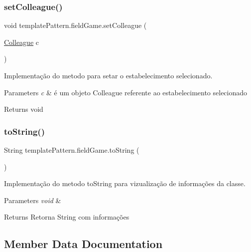 \subsubsection{\texorpdfstring{setColleague()}{setColleague()}}
{\footnotesize\ttfamily void template\+Pattern.\+field\+Game.\+set\+Colleague (\begin{DoxyParamCaption}\item[{\mbox{\hyperlink{classmediator_pattern_1_1_colleague}{Colleague}}}]{c }\end{DoxyParamCaption})}



Implementação do metodo para setar o estabelecimento selecionado. 


\begin{DoxyParams}{Parameters}
{\em c} & é um objeto Colleague referente ao estabelecimento selecionado \\
\hline
\end{DoxyParams}
\begin{DoxyReturn}{Returns}
void 
\end{DoxyReturn}
\mbox{\label{classtemplate_pattern_1_1field_game_a7dd7b0d767ea43e7f41f9acf9515e0cc}} 
\subsubsection{\texorpdfstring{toString()}{toString()}}
{\footnotesize\ttfamily String template\+Pattern.\+field\+Game.\+to\+String (\begin{DoxyParamCaption}{ }\end{DoxyParamCaption})}



Implementação do metodo to\+String para vizualização de informações da classe. 


\begin{DoxyParams}{Parameters}
{\em void} & \\
\hline
\end{DoxyParams}
\begin{DoxyReturn}{Returns}
Retorna String com informações 
\end{DoxyReturn}


\subsection{Member Data Documentation}
\mbox{\label{classtemplate_pattern_1_1field_game_a190a95adf3ae999df58ad0de60a32c72}} 
